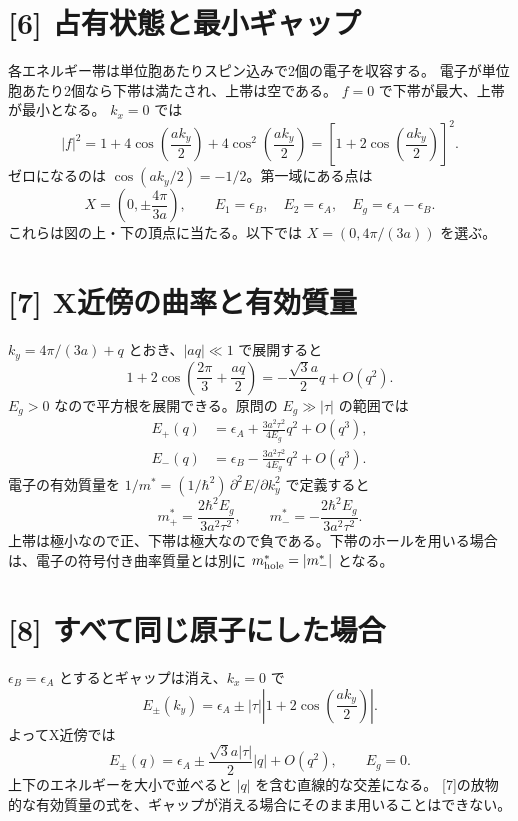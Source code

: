 \documentclass[11pt,a4paper]{article}
\begin{document}
\section*{[6] 占有状態と最小ギャップ}
各エネルギー帯は単位胞あたりスピン込みで2個の電子を収容する。
電子が単位胞あたり2個なら下帯は満たされ、上帯は空である。
$f=0$ で下帯が最大、上帯が最小となる。
$k_x=0$ では
\[
 |f|^2=1+4\cos\left(\frac{ak_y}{2}\right)+4\cos^2\left(\frac{ak_y}{2}\right)
       =\left[1+2\cos\left(\frac{ak_y}{2}\right)\right]^2.
\]
ゼロになるのは $\cos(ak_y/2)=-1/2$。第一域にある点は
\begin{equation}
 \boxed{X=\left(0,\pm\frac{4\pi}{3a}\right),\qquad
 E_1=\epsilon_B,\quad E_2=\epsilon_A,\quad E_g=\epsilon_A-\epsilon_B.}
\end{equation}
これらは図の上・下の頂点に当たる。以下では $X=(0,4\pi/(3a))$ を選ぶ。

\section*{[7] X近傍の曲率と有効質量}
$k_y=4\pi/(3a)+q$ とおき、$|aq|\ll1$ で展開すると
\[
 1+2\cos\left(\frac{2\pi}{3}+\frac{aq}{2}\right)
 =-\frac{\sqrt3a}{2}q+O(q^2).
\]
$E_g>0$ なので平方根を展開できる。原問の $E_g\gg|\tau|$ の範囲では
\begin{align}
 E_+(q)&=\epsilon_A+\frac{3a^2\tau^2}{4E_g}q^2+O(q^3),\\
 E_-(q)&=\epsilon_B-\frac{3a^2\tau^2}{4E_g}q^2+O(q^3).
\end{align}
電子の有効質量を $1/m^*=(1/\hbar^2)\,\partial^2 E/\partial k_y^2$ で定義すると
\begin{equation}
 \boxed{m^*_+=\frac{2\hbar^2 E_g}{3a^2\tau^2},\qquad
 m^*_-=-\frac{2\hbar^2 E_g}{3a^2\tau^2}.}
\end{equation}
上帯は極小なので正、下帯は極大なので負である。下帯のホールを用いる場合は、電子の符号付き曲率質量とは別に $m^*_{\rm hole}=|m^*_-|$ となる。

\clearpage
\section*{[8] すべて同じ原子にした場合}
$\epsilon_B=\epsilon_A$ とするとギャップは消え、$k_x=0$ で
\[
 E_\pm(k_y)=\epsilon_A\pm|\tau|\left|1+2\cos\left(\frac{ak_y}{2}\right)\right|.
\]
よってX近傍では
\begin{equation}
 \boxed{E_\pm(q)=\epsilon_A\pm\frac{\sqrt3a|\tau|}{2}|q|+O(q^2),\qquad E_g=0.}
\end{equation}
上下のエネルギーを大小で並べると $|q|$ を含む直線的な交差になる。
[7]の放物的な有効質量の式を、ギャップが消える場合にそのまま用いることはできない。
\end{document}
